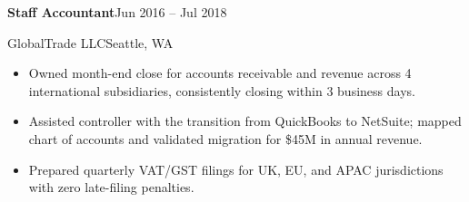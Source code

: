 \documentclass[10pt]{article}
\newcommand{\cvdate}[1]{{\color{softgray}\footnotesize #1}}
\newcommand{\experienceentry}[4]{%
  \vspace{0.45em}%
  {\bfseries #1}\hfill{\cvdate{#3}}%
  \par\vspace{0.05em}%
  {\color{accent}#2}\hfill{\color{softgray}\footnotesize #4}%
  \vspace{0.2em}\par%
}
\begin{document}
\begin{minipage}[t]{0.68\textwidth}
\experienceentry{Staff Accountant}{GlobalTrade LLC}
  {Jun 2016 -- Jul 2018}{Seattle, WA}
\begin{itemize}
  \item Owned month-end close for accounts receivable and revenue across
    4 international subsidiaries, consistently closing within 3 business
    days.
  \item Assisted controller with the transition from QuickBooks to
    NetSuite; mapped chart of accounts and validated migration for
    \$45M in annual revenue.
  \item Prepared quarterly VAT/GST filings for UK, EU, and APAC
    jurisdictions with zero late-filing penalties.
\end{itemize}

\end{minipage}
\end{document}
